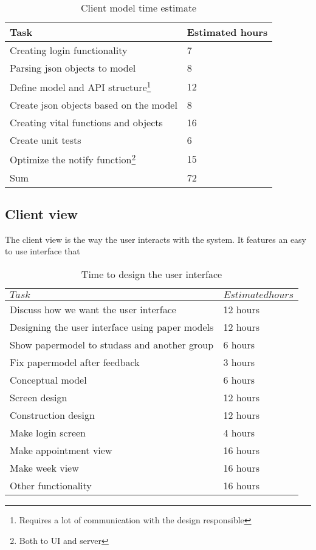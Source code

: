 \documentclass[a4paper, english, 12pt]{article}
\begin{document}
 \begin{table}[h]
    \begin{center}
    \caption{Client model time estimate} 
    \label{clientmodel}
    \vspace{0,5cm}
    \begin{tabular}{ll} \\ 
        \hline
        Task & Estimated hours\\
        \hline 
	Creating login functionality & 7 \\
	Parsing json objects to model & 8 \\
	Define model and API structure\footnote{Requires a lot of communication with the design responsible}  & 12\\
	Create json objects based on the model & 8 \\
	Creating vital functions and objects & 16 \\
	Create unit tests & 6 \\
	Optimize the notify function\footnote{Both to UI and server} & 15 \\	
        \hline
	Sum & 72\\
	\hline
    \end{tabular}
    \end{center}
\end{table}



\subsection{Client view}
The client view is the way the user interacts with the system. It features an easy to use interface that 

\begin{table}[h]
    \begin{center}
    \caption{Time to design the user interface} 
    \label{UI}
    \vspace{0,5cm}
    \begin{tabular}{ll} \\ 
        \hline
        $Task$ & $Estimated hours$\\
        \hline 
    Discuss how we want the user interface & 12 hours\\
    Designing the user interface using paper models & 12 hours\\    
    Show papermodel to studass and another group & 6 hours\\
    Fix papermodel after feedback & 3 hours\\
    Conceptual model & 6 hours\\
    Screen design & 12 hours\\
    Construction design & 12 hours\\
    Make login screen & 4 hours\\
    Make appointment view & 16 hours\\
    Make week view & 16 hours\\
    Other functionality & 16 hours\\
        \hline
    \end{tabular}
    \end{center}
\end{table}
\end{document}
